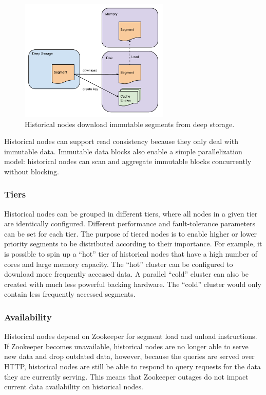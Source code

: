 \documentclass{acm_proc_article-sp}
\begin{document}
\begin{figure}
\centering
\includegraphics[width = 2.8in]{historical_download}
\caption{Historical nodes download immutable segments from deep storage.}
\label{fig:historical_download}
\end{figure}

Historical nodes can support read consistency because they only deal with
immutable data. Immutable data blocks also enable a simple parallelization
model: historical nodes can scan and aggregate immutable blocks concurrently
without blocking.
 
\subsubsection{Tiers}
\label{sec:tiers}
Historical nodes can be grouped in different tiers, where all nodes in a
given tier are identically configured. Different performance and
fault-tolerance parameters can be set for each tier. The purpose of
tiered nodes is to enable higher or lower priority segments to be
distributed according to their importance. For example, it is possible
to spin up a “hot” tier of historical nodes that have a high number of
cores and large memory capacity. The “hot” cluster can be configured to
download more frequently accessed data. A parallel “cold” cluster
can also be created with much less powerful backing hardware. The
“cold” cluster would only contain less frequently accessed segments.

\subsubsection{Availability}
Historical nodes depend on Zookeeper for segment load and unload instructions.
If Zookeeper becomes unavailable, historical nodes are no longer able to serve
new data and drop outdated data, however, because the queries are served over
HTTP, historical nodes are still be able to respond to query requests for
the data they are currently serving. This means that Zookeeper outages do not
impact current data availability on historical nodes. 
\end{document}
